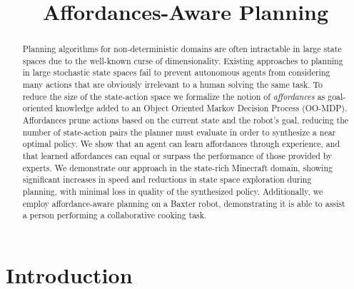 \documentclass[conference]{IEEEtran}
\newcommand{\dnote}[1]{\textcolor{Green}{\textbf{D: #1}}}
\begin{document}
\title{Affordances-Aware Planning}


\maketitle

\begin{abstract}
Planning algorithms for non-deterministic domains are often
intractable in large state spaces due to the well-known curse of
dimensionality. Existing approaches to planning in large stochastic
state spaces fail to prevent autonomous agents from considering many
actions that are obviously irrelevant to a human solving the same
task. To reduce the size of the state-action space
we formalize the notion of {\em affordances} as
goal-oriented knowledge added to an Object Oriented Markov Decision
Process (OO-MDP).  Affordances prune actions based on the current
state and the robot's goal, reducing the number of state-action pairs
the planner must evaluate in order to synthesize a near optimal
policy. We show that an agent can learn affordances through
experience, and that learned affordances can equal or surpass the
performance of those provided by experts.
We demonstrate our approach in the state-rich Minecraft domain, showing significant increases in
speed and reductions in state space exploration during planning, with
minimal loss in quality of the synthesized policy.  Additionally, we
employ affordance-aware planning on a Baxter robot, demonstrating it
is able to assist a person performing a collaborative cooking task.
\end{abstract}

\IEEEpeerreviewmaketitle

\section{Introduction}
\label{sec:introduction}
\end{document}
